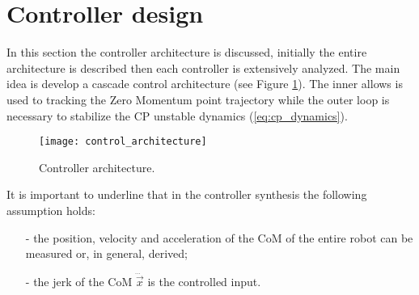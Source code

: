 \section{Controller design}
In this section the controller architecture is discussed, initially the entire architecture
is described then each controller is extensively analyzed.
The main idea is develop a cascade control architecture (see Figure \ref{fig:control_architecuture}).
The inner allows is used to tracking the
Zero Momentum point trajectory while the outer loop is necessary to stabilize the
CP unstable dynamics (\ref{eq:cp_dynamics}).
\begin{figure}[!ht]
  \centering
  \texttt{[image: control\_architecture]}
  \caption{Controller architecture. \label{fig:control_architecuture}}
\end{figure}
It is important to underline that in the controller synthesis the following assumption holds:
\begin{itemize}
\item[-] the position, velocity and acceleration of the CoM of the entire robot can be measured or,
  in general, derived;
\item[-] the jerk of the CoM $\dddot{\vec{x}}$ is the controlled input.
\end{itemize}

